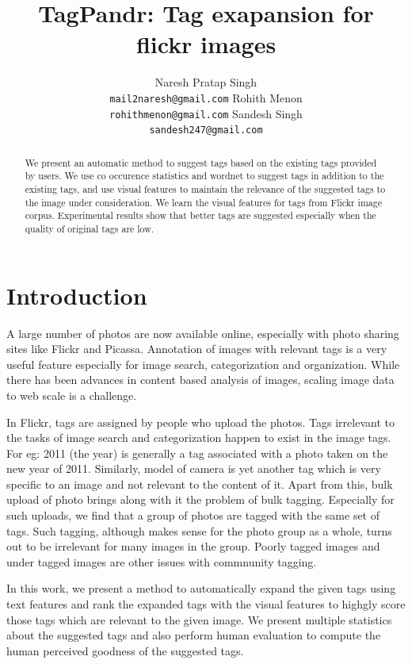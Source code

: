 \documentclass[12pt]{article}
\title{TagPandr: Tag exapansion for flickr images}
\author{Naresh Pratap Singh\\
  {\tt mail2naresh@gmail.com}  \And
  Rohith Menon\\
  {\tt rohithmenon@gmail.com} \And
  Sandesh Singh\\
  {\tt sandesh247@gmail.com}
  }
\date{}
\begin{document}
\maketitle
\begin{abstract}
We present an automatic method to suggest tags based on the existing tags provided by
users. We use co occurence statistics and wordnet to suggest tags in addition
to the existing tags, and use visual features to maintain the relevance of
the suggested tags to the image under consideration. We learn the visual features
for tags from Flickr image corpus. Experimental results show that better tags
  are suggested especially when the quality of original tags are low.
\end{abstract}

\section{Introduction}

A large number of photos are now available online, especially with photo sharing sites like
Flickr and Picassa. Annotation of images with relevant tags is a very useful feature especially
for image search, categorization and organization. While there has been advances in content
based analysis of images, scaling image data to web scale is a challenge.

In Flickr, tags are assigned by people who upload the photos. Tags irrelevant to the tasks of
image search and categorization happen to exist in the image tags. For eg: 2011 (the year) is generally
a tag associated with a photo taken on the new year of 2011. Similarly, model of camera is yet
another tag which is very specific to an image and not relevant to the content of it. Apart from
this, bulk upload of photo brings along with it the problem of bulk tagging. Especially for such
uploads, we find that a group of photos are tagged with the same set of tags. Such tagging, although
makes sense for the photo group as a whole, turns out to be irrelevant for many images in the group.
Poorly tagged images and under tagged images are other issues with commnunity tagging.

In this work, we present a method to automatically expand the given tags using text features and
rank the expanded tags with the visual features to highgly score those tags which are relevant to
the given image. We present multiple statistics about the suggested tags and also perform human
evaluation to compute the human perceived goodness of the suggested tags.
\end{document}
